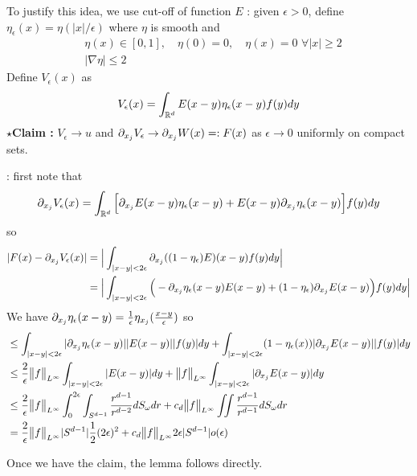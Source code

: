 \documentclass[12pt,a4paper]{article}
\newenvironment{proof}
{\begin{changemargin}{0.5cm}{0.5cm} 
	}%
	{\end{changemargin}
}
\newenvironment{subproof}
{\begin{changemargin}{0.5cm}{0.5cm} 
	}%
	{\end{changemargin}
}
\newenvironment{p}
{\begin{proof} 
	}%
	{\end{proof}
}
\begin{document}
\begin{p}
\pf To justify this idea, we use cut-off of function $E$ : given $\epsilon>0$, define $\eta_{\epsilon}(x) = \eta( |x|/ \epsilon)$ where $\eta$ is smooth and
\begin{align*}
& \eta(x) \in [0,1], \quad \eta(0) =0, \quad \eta(x) =0 \,\, \forall |x| \geq 2 \\
& |\nabla \eta| \leq 2
\end{align*}
Define $V_{\epsilon}(x)$ as
\begin{align*}
V_{\epsilon}(x) = \int_{\mathbb{R}^d}  E(x-y) \eta_{\epsilon}(x-y) f(y)dy
\end{align*}
$\star$\textbf{Claim :} $V_{\epsilon} \rightarrow u$ and $\partial_{x_j} V_{\epsilon} \rightarrow \partial_{x_j} W(x) =: F(x)$ as $\epsilon \rightarrow 0$ uniformly on compact sets.
\begin{subproof}
: first note that
\begin{align*}
\partial_{x_j} V_{\epsilon}(x) = \int_{\mathbb{R}^d} \Big[ \partial_{x_j}E(x-y) \eta_{\epsilon}(x-y) + E(x-y) \partial_{x_j}\eta_{\epsilon}(x-y) \Big] f(y) dy
\end{align*}
so
\begin{align*}
|F(x)- \partial_{x_j}V_{\epsilon}(x) | &= \Big| \int_{|x-y| < 2\epsilon} \partial_{x_j}((1-\eta_{\epsilon})E)(x-y) f(y) dy \Big| \\
& = \Big| \int_{|x-y| < 2\epsilon} \Big( -\partial_{x_j} \eta_{\epsilon}(x-y)E(x-y) + (1-\eta_{\epsilon}) \partial_{x_j} E(x-y)\Big)f(y) dy \Big|
\end{align*}
We have $\partial_{x_j} \eta_{\epsilon}(x-y) = \frac{1}{\epsilon} \eta_{x_j}(\frac{x-y}{\epsilon})$ so
\begin{align*}
& \leq \int_{|x-y|< 2\epsilon} |\partial_{x_j} \eta_{\epsilon}(x-y)||E(x-y)||f(y)|dy + \int_{|x-y|<2\epsilon} (1-\eta_{\epsilon}(x)) |\partial_{x_j}E(x-y)| |f(y)|dy \\
& \leq \frac{2}{\epsilon} \bigl\lVert f\bigr\rVert_{L^{\infty}} \int_{|x-y|< 2\epsilon} |E(x-y)| dy + \bigl\lVert f\bigr\rVert_{L^{\infty}} \int_{|x-y|< 2\epsilon} |\partial_{x_j} E(x-y)|dy \\
& \leq \frac{2}{\epsilon}\bigl\lVert f\bigr\rVert_{L^{\infty}} \int_0^{2\epsilon} \int_{S^{d-1}} \frac{r^{d-1}}{r^{d-2}} dS_{\omega} dr + c_d \bigl\lVert f\bigr\rVert_{L^{\infty}} \iint \frac{r^{d-1}}{r^{d-1}}dS_{\omega} dr \\
& = \frac{2}{\epsilon} \bigl\lVert f\bigr\rVert_{L^{\infty}} |S^{d-1}| \frac{1}{2}(2\epsilon)^2 + c_d \bigl\lVert f\bigr\rVert_{L^{\infty}} 2\epsilon |S^{d-1}|  o(\epsilon)
\end{align*}
\end{subproof}
Once we have the claim, the lemma follows directly.

\eop
\end{p}
\s
\end{document}
